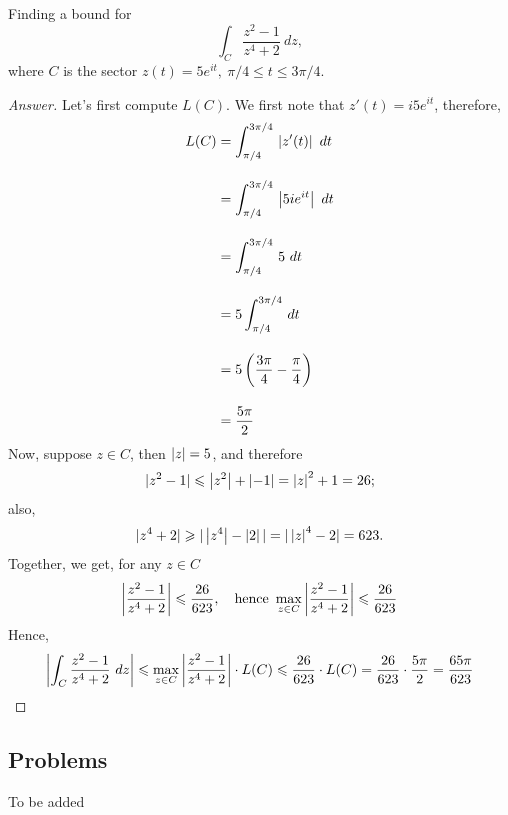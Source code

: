 \begin{example}[in-class]
Finding a bound for
\[\int_C\frac{z^2 - 1}{z^4 + 2}\ dz,\]
where $C$ is the sector $z(t) = 5e^{it},\ \pi/4 \leq t \leq 3\pi/4$.
\end{example}
\begin{proof}[Answer]
Let's first compute $L(C)$. We first note that $z'(t) = i5e^{it}$, therefore,
\begin{align*}
L(C) &= \int_{\pi/4}^{3\pi/4}\,\left\lvert z'(t)\right\rvert\ dt\\[1em] 
 &= \int_{\pi/4}^{3\pi/4}\,\left\lvert5ie^{it}\right\rvert\ dt\\[1em]
 &= \int_{\pi/4}^{3\pi/4}\,5\ dt\\[1em]
 &= 5\int_{\pi/4}^{3\pi/4}\,dt\\[1em]
 &= 5\left(\frac{3\pi}{4} - \frac{\pi}{4}\right)\\[1em]
 &= \frac{5\pi}{2}
\end{align*}
Now, suppose $z \in C$, then $\left\lvert z\right\rvert = 5$, and therefore
\[|z^2 - 1| \leqslant \left\lvert z^2\right\rvert + \left\lvert-1\right\rvert = \left\lvert z\right\rvert^2 + 1 = 26;\]
also,
\[|z^4 + 2| \geqslant |\left\lvert z^4\right\rvert - \left\lvert2\right\rvert| = |\left\lvert z\right\rvert^4 - 2| = 623.\]
Together, we get, for any $z \in C$
\[\left\lvert\frac{z^2 - 1}{z^4 + 2}\right\rvert \leqslant \frac{26}{623},\quad \text{hence }\max_{z \in C}\left\lvert\frac{z^2 - 1}{z^4 + 2}\right\rvert \leqslant \frac{26}{623}\]
Hence, 
\[\left\lvert\int_C\frac{z^2 - 1}{z^4 + 2}\ dz\right\rvert \leqslant \max_{z \in C}\left\lvert\frac{z^2 - 1}{z^4 + 2}\right\rvert\cdot L(C) \leqslant \frac{26}{623}\cdot L(C) = \frac{26}{623}\cdot \frac{5\pi}{2} = \frac{65\pi}{623}\]
\end{proof}

\vspace*{2em}

\subsection{Problems}
\vspace{0.1in}
To be added
%
